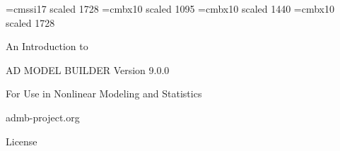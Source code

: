 %
\font\halfinch=cmssi17 scaled 1728
\font\smallheadfont=cmbx10 scaled 1095
\font\largeheadfont=cmbx10 scaled 1440
\font\hugeheadfont=cmbx10 scaled 1728


\vspace*{2in}
{\hugeheadfont
\centerline{An Introduction to}
\vspace{0.25in}
\centerline{{\halfinch AD MODEL BUILDER Version 9.0.0}}
\vspace{0.25in}
\centerline{For Use in Nonlinear Modeling and Statistics}}

\vspace{0.5in}
\centerline{admb-project.org}

\vfill
\eject

\centerline{\LARGE License}


\newpage

